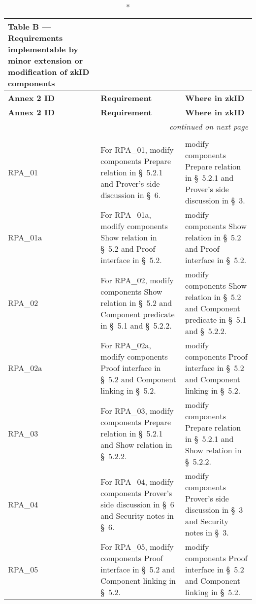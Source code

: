 \clearpage
\begin{landscape}
\small
\begin{longtable}{p{3cm} p{10cm} p{7cm}}
\caption*{Table B — Requirements implementable by minor extension or modification of zkID components}\\
\toprule
\textbf{Annex 2 ID} &
\textbf{Requirement} &
\textbf{Where in zkID} \\
\midrule
\endfirsthead
\toprule
\textbf{Annex 2 ID} &
\textbf{Requirement} &
\textbf{Where in zkID} \\
\midrule
\endhead
\midrule
\multicolumn{3}{r}{\emph{continued on next page}}\\
\bottomrule
\endfoot
\bottomrule
\endlastfoot

\multicolumn{3}{l}{\textbf{Topic 6 — Relying Party authentication and User approval}}\\

RPA\_01 &
For RPA\_01, modify components Prepare relation in \S~5.2.1 and Prover's side discussion in \S~6. &
modify components Prepare relation in \S~5.2.1 and Prover's side discussion in \S~3. \\

RPA\_01a &
For RPA\_01a, modify components Show relation in \S~5.2 and Proof interface in \S~5.2. &
modify components Show relation in \S~5.2 and Proof interface in \S~5.2. \\

RPA\_02 &
For RPA\_02, modify components Show relation in \S~5.2 and Component predicate in \S~5.1 and \S~5.2.2. &
modify components Show relation in \S~5.2 and Component predicate in \S~5.1 and \S~5.2.2. \\

RPA\_02a &
For RPA\_02a, modify components Proof interface in \S~5.2 and Component linking in \S~5.2. &
modify components Proof interface in \S~5.2 and Component linking in \S~5.2. \\

RPA\_03 &
For RPA\_03, modify components Prepare relation in \S~5.2.1 and Show relation in \S~5.2.2. &
modify components Prepare relation in \S~5.2.1 and Show relation in \S~5.2.2. \\

RPA\_04 &
For RPA\_04, modify components Prover's side discussion in \S~6 and Security notes in \S~6. &
modify components Prover's side discussion in \S~3 and Security notes in \S~3. \\

RPA\_05 &
For RPA\_05, modify components Proof interface in \S~5.2 and Component linking in \S~5.2. &
modify components Proof interface in \S~5.2 and Component linking in \S~5.2. \\


\end{longtable}
\end{landscape}

